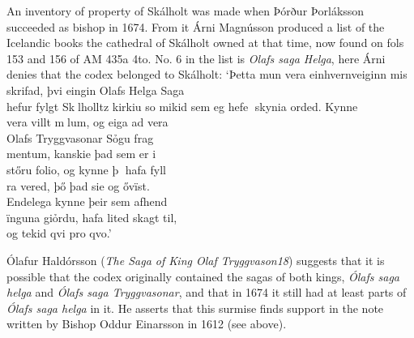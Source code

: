 \documentclass[11pt,twoside]{article}\makeatletter
\begin{document}
An inventory of property of Skálholt was made when  {\name Þórður Þorláksson} succeeded as bishop in 1674. From it Árni Magnússon produced a list of the Icelandic books the cathedral of Skálholt owned at that time, now found on fols 153 and 156 of AM 435a 4to. No. 6 in the list is \textit{Olafs saga Helga}, here Árni denies that the codex belonged to Skálholt: ‘Þetta mun vera einhvernveiginn mis{\hskip1pt}\\{}skrifad, þvi eingin Olafs Helga Saga {\hskip1pt}\\{} hefur fylgt Sklholltz kirkiu so mikid  sem eg hefe skynia orded. Kynne {\hskip1pt}\\{} vera villt mlum, og eiga ad vera {\hskip1pt}\\{} Olafs Tryggvasonar Sỏgu frag{\hskip1pt}\\{}mentum, kanskie þad sem er i {\hskip1pt}\\{} stőru folio, og kynne þ hafa fyll{\hskip1pt}\\{}ra vered, þő þad sie og ővïst. {\hskip1pt}\\{} Endelega kynne þeir sem afhend{\hskip1pt}\\{}ïnguna giỏrdu, hafa lited skagt til, {\hskip1pt}\\{} og tekid qvi pro qvo.’ \par
Ólafur Haldórsson (\textit{The Saga of King Olaf Tryggvason18}) suggests that it is possible that the codex originally contained the sagas of both kings, \textit{Ólafs saga helga} and \textit{Ólafs saga Tryggvasonar}, and that in 1674 it still had at least parts of \textit{Ólafs saga helga} in it. He asserts that this surmise finds support in the note written by Bishop  {\name Oddur Einarsson} in 1612 (see above).
\end{document}
